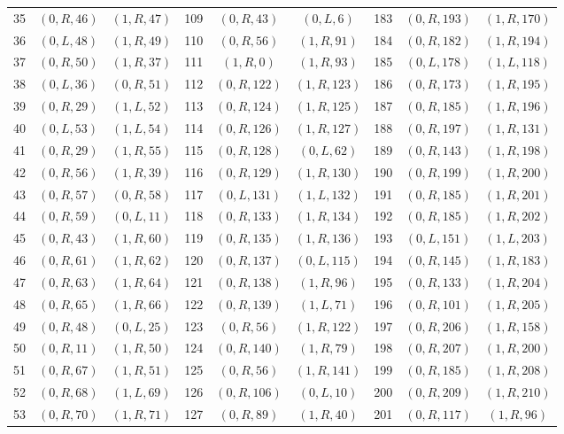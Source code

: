 {\begin{longtable}{rcc@{\qquad}rcc@{\qquad}rcc}
35 & $(0,R,46)$ & $(1,R,47)$ & 109 & $(0,R,43)$ & $(0,L,6)$ & 183 & $(0,R,193)$ & $(1,R,170)$\\
36 & $(0,L,48)$ & $(1,R,49)$ & 110 & $(0,R,56)$ & $(1,R,91)$ & 184 & $(0,R,182)$ & $(1,R,194)$\\
37 & $(0,R,50)$ & $(1,R,37)$ & 111 & $(1,R,0)$ & $(1,R,93)$ & 185 & $(0,L,178)$ & $(1,L,118)$\\
38 & $(0,L,36)$ & $(0,R,51)$ & 112 & $(0,R,122)$ & $(1,R,123)$ & 186 & $(0,R,173)$ & $(1,R,195)$\\
39 & $(0,R,29)$ & $(1,L,52)$ & 113 & $(0,R,124)$ & $(1,R,125)$ & 187 & $(0,R,185)$ & $(1,R,196)$\\
40 & $(0,L,53)$ & $(1,L,54)$ & 114 & $(0,R,126)$ & $(1,R,127)$ & 188 & $(0,R,197)$ & $(1,R,131)$\\
41 & $(0,R,29)$ & $(1,R,55)$ & 115 & $(0,R,128)$ & $(0,L,62)$ & 189 & $(0,R,143)$ & $(1,R,198)$\\
42 & $(0,R,56)$ & $(1,R,39)$ & 116 & $(0,R,129)$ & $(1,R,130)$ & 190 & $(0,R,199)$ & $(1,R,200)$\\
43 & $(0,R,57)$ & $(0,R,58)$ & 117 & $(0,L,131)$ & $(1,L,132)$ & 191 & $(0,R,185)$ & $(1,R,201)$\\
44 & $(0,R,59)$ & $(0,L,11)$ & 118 & $(0,R,133)$ & $(1,R,134)$ & 192 & $(0,R,185)$ & $(1,R,202)$\\
45 & $(0,R,43)$ & $(1,R,60)$ & 119 & $(0,R,135)$ & $(1,R,136)$ & 193 & $(0,L,151)$ & $(1,L,203)$\\
46 & $(0,R,61)$ & $(1,R,62)$ & 120 & $(0,R,137)$ & $(0,L,115)$ & 194 & $(0,R,145)$ & $(1,R,183)$\\
47 & $(0,R,63)$ & $(1,R,64)$ & 121 & $(0,R,138)$ & $(1,R,96)$ & 195 & $(0,R,133)$ & $(1,R,204)$\\
48 & $(0,R,65)$ & $(1,R,66)$ & 122 & $(0,R,139)$ & $(1,L,71)$ & 196 & $(0,R,101)$ & $(1,R,205)$\\
49 & $(0,R,48)$ & $(0,L,25)$ & 123 & $(0,R,56)$ & $(1,R,122)$ & 197 & $(0,R,206)$ & $(1,R,158)$\\
50 & $(0,R,11)$ & $(1,R,50)$ & 124 & $(0,R,140)$ & $(1,R,79)$ & 198 & $(0,R,207)$ & $(1,R,200)$\\
51 & $(0,R,67)$ & $(1,R,51)$ & 125 & $(0,R,56)$ & $(1,R,141)$ & 199 & $(0,R,185)$ & $(1,R,208)$\\
52 & $(0,R,68)$ & $(1,L,69)$ & 126 & $(0,R,106)$ & $(0,L,10)$ & 200 & $(0,R,209)$ & $(1,R,210)$\\
53 & $(0,R,70)$ & $(1,R,71)$ & 127 & $(0,R,89)$ & $(1,R,40)$ & 201 & $(0,R,117)$ & $(1,R,96)$\\

\end{longtable}}
